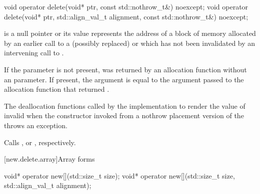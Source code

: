 %
\begin{itemdecl}
void operator delete(void* ptr, const std::nothrow_t&) noexcept;
void operator delete(void* ptr, std::align_val_t alignment, const std::nothrow_t&) noexcept;
\end{itemdecl}

\begin{itemdescr}
\pnum
\expects
{} is a null pointer or
its value represents the address of
a block of memory allocated by
an earlier call to a (possibly replaced)
or
which has not been invalidated by an intervening call to
.

\pnum
If the  parameter is not present,
 was returned by an allocation function
without an  parameter.
If present, the  argument
is equal to the  argument
passed to the allocation function that returned .

\pnum
\effects
The
deallocation functions
called by the implementation
to render the value of  invalid
when the constructor invoked from a nothrow
placement version of the  throws an exception.

\pnum
\replaceable
{}

\pnum
{}
Calls ,
or ,
respectively.
\end{itemdescr}

[new.delete.array]{Array forms}

%
\begin{itemdecl}
void* operator new[](std::size_t size);
void* operator new[](std::size_t size, std::align_val_t alignment);
\end{itemdecl}

